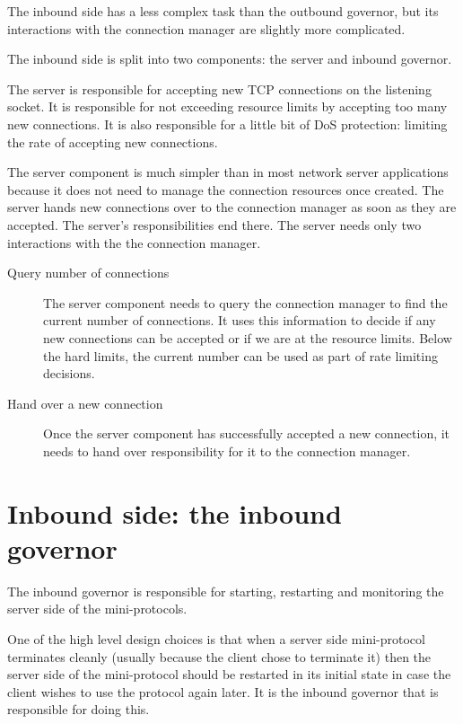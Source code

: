 The inbound side has a less complex task than the outbound governor, but its
interactions with the connection manager are slightly more complicated.

The inbound side is split into two components: the server and inbound governor.

The server is responsible for accepting new TCP connections on the listening
socket. It is responsible for not exceeding resource limits by accepting too
many new connections. It is also responsible for a little bit of DoS protection:
limiting the rate of accepting new connections.

The server component is much simpler than in most network server applications
because it does not need to manage the connection resources once created. The
server hands new connections over to the connection manager as soon as they are
accepted. The server's responsibilities end there. The server needs only two
interactions with the the connection manager.
\begin{description}
\item[Query number of connections] The server component needs to query the
  connection manager to find the current number of connections. It uses this
  information to decide if any new connections can be accepted or if we are
  at the resource limits. Below the hard limits, the current number can be used
  as part of rate limiting decisions.

\item[Hand over a new connection] Once the server component has successfully
  accepted a new connection, it needs to hand over responsibility for it to
  the connection manager.
\end{description}


\section{Inbound side: the inbound governor}

The inbound governor is responsible for starting, restarting and monitoring the
server side of the mini-protocols.

One of the high level design choices is that when a server side mini-protocol
terminates cleanly (usually because the client chose to terminate it) then the
server side of the mini-protocol should be restarted in its initial state in
case the client wishes to use the protocol again later. It is the inbound
governor that is responsible for doing this.

